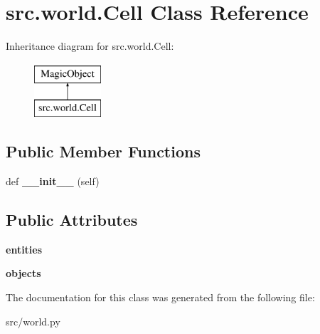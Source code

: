\hypertarget{classsrc_1_1world_1_1_cell}{}\section{src.\+world.\+Cell Class Reference}
\label{classsrc_1_1world_1_1_cell}
Inheritance diagram for src.\+world.\+Cell\+:\begin{figure}[H]
\begin{center}
\leavevmode
\includegraphics[height=2.000000cm]{classsrc_1_1world_1_1_cell}
\end{center}
\end{figure}
\subsection*{Public Member Functions}
\begin{DoxyCompactItemize}
\item 
\hypertarget{classsrc_1_1world_1_1_cell_a44c19bca832c4188d1740ea29bf5fa35}{}\label{classsrc_1_1world_1_1_cell_a44c19bca832c4188d1740ea29bf5fa35} 
def {\bfseries \+\_\+\+\_\+init\+\_\+\+\_\+} (self)
\end{DoxyCompactItemize}
\subsection*{Public Attributes}
\begin{DoxyCompactItemize}
\item 
\hypertarget{classsrc_1_1world_1_1_cell_a41360426ab5be65dd4164205785f8eca}{}\label{classsrc_1_1world_1_1_cell_a41360426ab5be65dd4164205785f8eca} 
{\bfseries entities}
\item 
\hypertarget{classsrc_1_1world_1_1_cell_a29e7ce7e5900f509c10212e6e10eaed7}{}\label{classsrc_1_1world_1_1_cell_a29e7ce7e5900f509c10212e6e10eaed7} 
{\bfseries objects}
\end{DoxyCompactItemize}


The documentation for this class was generated from the following file\+:\begin{DoxyCompactItemize}
\item 
src/world.\+py\end{DoxyCompactItemize}
